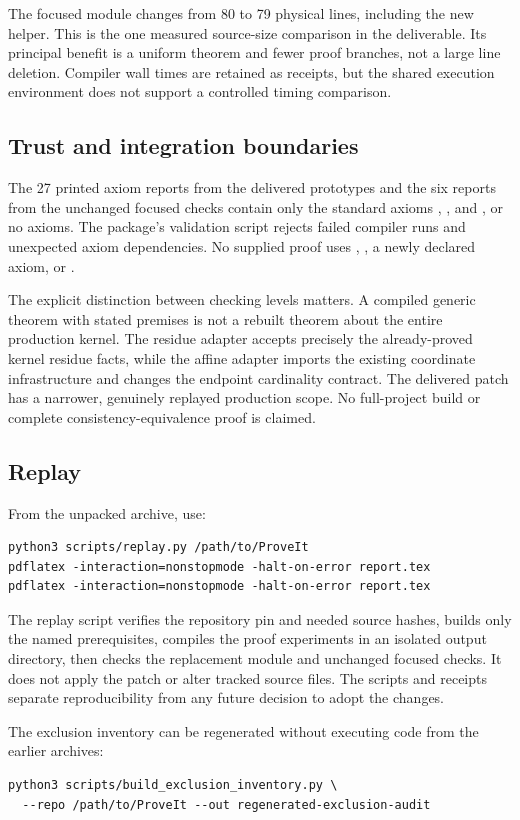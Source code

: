 The focused module changes from 80 to 79 physical lines, including the new
helper. This is the one measured source-size comparison in the deliverable.
Its principal benefit is a uniform theorem and fewer proof branches, not
a large line deletion. Compiler wall times are retained as receipts, but
the shared execution environment does not support a controlled timing
comparison.

\subsection{Trust and integration boundaries}

The 27 printed axiom reports from the delivered prototypes and the six
reports from the unchanged focused checks contain only the standard axioms
, , and , or no
axioms. The package's validation script rejects failed compiler runs and
unexpected axiom dependencies. No supplied proof uses ,
, a newly declared axiom, or .

The explicit distinction between checking levels matters. A compiled
generic theorem with stated premises is not a rebuilt theorem about the
entire production kernel. The residue adapter accepts precisely the
already-proved kernel residue facts, while the affine adapter imports the
existing coordinate infrastructure and changes the endpoint cardinality
contract. The delivered patch has a narrower, genuinely replayed production
scope. No full-project build or complete consistency-equivalence proof is
claimed.

\subsection{Replay}

From the unpacked archive, use:
\begin{lstlisting}
python3 scripts/replay.py /path/to/ProveIt
pdflatex -interaction=nonstopmode -halt-on-error report.tex
pdflatex -interaction=nonstopmode -halt-on-error report.tex
\end{lstlisting}
The replay script verifies the repository pin and needed source hashes,
builds only the named prerequisites, compiles the proof experiments in an
isolated output directory, then checks the replacement module and unchanged
focused checks. It does not apply the patch or alter tracked source files.
The scripts and receipts separate reproducibility from any future decision
to adopt the changes.

The exclusion inventory can be regenerated without executing code from
the earlier archives:
\begin{lstlisting}
python3 scripts/build_exclusion_inventory.py \
  --repo /path/to/ProveIt --out regenerated-exclusion-audit
\end{lstlisting}
